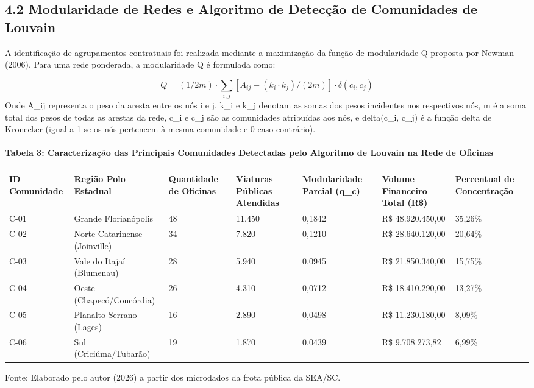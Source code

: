 \documentclass[10pt,a4paper,journal]{article}
\begin{document}
\subsection{4.2 Modularidade de Redes e Algoritmo de Detecção de Comunidades de Louvain}
A identificação de agrupamentos contratuais foi realizada mediante a maximização da função de modularidade Q proposta por Newman (2006). Para uma rede ponderada, a modularidade Q é formulada como:

\begin{equation}
Q = (1 / 2m) \cdot \sum_{i,j} [ A_{ij} - (k_{i} \cdot k_{j}) / (2m) ] \cdot \delta(c_{i}, c_{j}) \label{eq:5}
\end{equation}
Onde A\_ij representa o peso da aresta entre os nós i e j, k\_i e k\_j denotam as somas dos pesos incidentes nos respectivos nós, m é a soma total dos pesos de todas as arestas da rede, c\_i e c\_j são as comunidades atribuídas aos nós, e delta(c\_i, c\_j) é a função delta de Kronecker (igual a 1 se os nós pertencem à mesma comunidade e 0 caso contrário).

\paragraph{Tabela 3: Caracterização das Principais Comunidades Detectadas pelo Algoritmo de Louvain na Rede de Oficinas}
\begin{table}[htbp]
\centering
\small
\begin{tabular}{lllllll}
\toprule
ID Comunidade & Região Polo Estadual & Quantidade de Oficinas & Viaturas Públicas Atendidas & Modularidade Parcial (q\_c) & Volume Financeiro Total (R\$) & Percentual de Concentração \\
\midrule
C-01 & Grande Florianópolis & 48 & 11.450 & 0,1842 & R\$ 48.920.450,00 & 35,26\% \\
C-02 & Norte Catarinense (Joinville) & 34 & 7.820 & 0,1210 & R\$ 28.640.120,00 & 20,64\% \\
C-03 & Vale do Itajaí (Blumenau) & 28 & 5.940 & 0,0945 & R\$ 21.850.340,00 & 15,75\% \\
C-04 & Oeste (Chapecó/Concórdia) & 26 & 4.310 & 0,0712 & R\$ 18.410.290,00 & 13,27\% \\
C-05 & Planalto Serrano (Lages) & 16 & 2.890 & 0,0498 & R\$ 11.230.180,00 & 8,09\% \\
C-06 & Sul (Criciúma/Tubarão) & 19 & 1.870 & 0,0439 & R\$ 9.708.273,82 & 6,99\% \\
\bottomrule
\end{tabular}
\end{table}
Fonte: Elaborado pelo autor (2026) a partir dos microdados da frota pública da SEA/SC.
\end{document}
